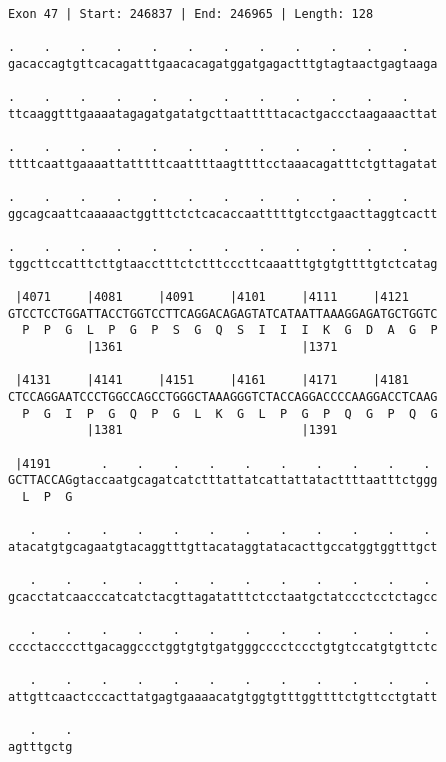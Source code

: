 \documentclass{article}
\begin{document}
\begin{Verbatim}
Exon 47 | Start: 246837 | End: 246965 | Length: 128
 
.    .    .    .    .    .    .    .    .    .    .    .    
gacaccagtgttcacagatttgaacacagatggatgagactttgtagtaactgagtaaga
  
.    .    .    .    .    .    .    .    .    .    .    .    
ttcaaggtttgaaaatagagatgatatgcttaatttttacactgaccctaagaaacttat
  
.    .    .    .    .    .    .    .    .    .    .    .    
ttttcaattgaaaattatttttcaattttaagttttcctaaacagatttctgttagatat
  
.    .    .    .    .    .    .    .    .    .    .    .    
ggcagcaattcaaaaactggtttctctcacaccaatttttgtcctgaacttaggtcactt
  
.    .    .    .    .    .    .    .    .    .    .    .    
tggcttccatttcttgtaacctttctctttcccttcaaatttgtgtgttttgtctcatag
  
 |4071     |4081     |4091     |4101     |4111     |4121    
GTCCTCCTGGATTACCTGGTCCTTCAGGACAGAGTATCATAATTAAAGGAGATGCTGGTC
  P  P  G  L  P  G  P  S  G  Q  S  I  I  I  K  G  D  A  G  P
           |1361                         |1371              
  
 |4131     |4141     |4151     |4161     |4171     |4181    
CTCCAGGAATCCCTGGCCAGCCTGGGCTAAAGGGTCTACCAGGACCCCAAGGACCTCAAG
  P  G  I  P  G  Q  P  G  L  K  G  L  P  G  P  Q  G  P  Q  G
           |1381                         |1391              
  
 |4191       .    .    .    .    .    .    .    .    .    . 
GCTTACCAGgtaccaatgcagatcatctttattatcattattatacttttaatttctggg
  L  P  G                                                   
  
   .    .    .    .    .    .    .    .    .    .    .    . 
atacatgtgcagaatgtacaggtttgttacataggtatacacttgccatggtggtttgct
  
   .    .    .    .    .    .    .    .    .    .    .    . 
gcacctatcaacccatcatctacgttagatatttctcctaatgctatccctcctctagcc
  
   .    .    .    .    .    .    .    .    .    .    .    . 
cccctaccccttgacaggccctggtgtgtgatgggcccctccctgtgtccatgtgttctc
  
   .    .    .    .    .    .    .    .    .    .    .    . 
attgttcaactcccacttatgagtgaaaacatgtggtgtttggttttctgttcctgtatt
  
   .    .
agtttgctg
\end{Verbatim}
\newpage
\end{document}
